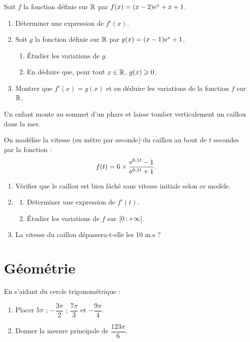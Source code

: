 \documentclass[a4paper,11pt]{article}
\begin{document}
\begin{cexercice}
Soit $f$ la fonction définie sur $\R$ par $f(x)=(x-2){\rm e}^x + x + 1$.
%
\begin{enumerate}
	\item Déterminer une expression de $f'(x)$.
	\item Soit $g$ la fonction définie sur $\R$ par $g(x) = (x - 1){\rm e}^x + 1$.
	\begin{enumerate}
		\item Étudier les variations de $g$.
		\item En déduire que, pour tout $x \in \R$, $g(x) \geqslant 0$.
	\end{enumerate}
	\item Montrer que $f'(x)=g(x)$ et en déduire les variations de la fonction $f$ sur $\R$.
\end{enumerate}
\end{cexercice}

\begin{cexercice}
Un enfant monte au sommet d’un phare et laisse tomber verticalement un caillou dans la mer.

On modélise la vitesse (en mètre par seconde) du caillou au bout de $t$ secondes par la fonction : \[ f(t)=6 \times \dfrac{{\rm e}^{0,1t}-1}{{\rm e}^{0,1t}+1}. \]
\begin{enumerate}
	\item Vérifier que le caillou est bien lâché sans vitesse initiale selon ce modèle.
	\item 
	\begin{enumerate}
		\item Déterminer une expression de $f'(t)$.
		\item Étudier les variations de $f$ sur $\mbox{\ensuremath{\left[0\mathpunct{};+\infty\right[}}$.
	\end{enumerate}
	\item La vitesse du caillou dépassera-t-elle les 10 m.s ?
\end{enumerate}
\end{cexercice}

\pagebreak

\section{Géométrie}

\begin{cexercice}
En s'aidant du cercle trigonométrique :
%
\begin{enumerate}[]
	\item Placer $5\pi$ ; $-\dfrac{3\pi}{2}$ ; $\dfrac{7\pi}{3}$ et $-\dfrac{9\pi}{4}$.
	\item Donner la mesure principale de $\dfrac{123\pi}{6}$.
\end{enumerate}
\end{cexercice}
\end{document}
